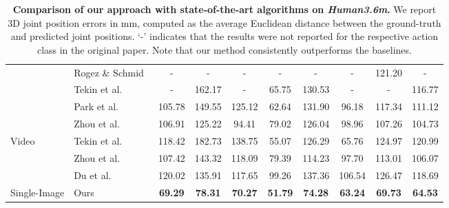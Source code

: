 \begin{table*}[tbph]
\begin{center}
{\begin{tabular}[b]{llcccccccc}
				&Rogez \& Schmid~\cite{Rogez16}	    & -           	& -              & -               & -           		   & -               & -                     & 121.20    	   & -   					\\
				&Tekin et al.~\cite{Tekin16b}       & -      		& 162.17         & -               & 65.75       		   & 130.53          & -                 	 & -			   & 116.77             				\\
				&Park et al.~\cite{Park16}          & 105.78    	& 149.55         & 125.12          & 62.64       		   & 131.90          & 96.18                 & 117.34   	   & 111.12      			\\
				&Zhou et al.~\cite{Zhou16b}         & 106.91    	& 125.22         & 94.41           & 79.02       		   & 126.04          & 98.96                 & 107.26   	   & 104.73      			\\
				\midrule
				\multirow{3}{*}{Video}
				&Tekin et al.~\cite{Tekin16a}		& 118.42    	& 182.73         & 138.75          & 55.07 			 	   & 126.29          & 65.76			  	 & 124.97		   & 120.99     				\\
				&Zhou et al.~\cite{Zhou16a}         & 107.42    	& 143.32         & 118.09          & 79.39       		   & 114.23          & 97.70                 & 113.01   	   & 106.07      			\\
				&Du et al.~\cite{Du16}              & 120.02     	& 135.91         & 117.65          & 99.26       		   & 137.36       	 & 106.54            	 & 126.47    	   & 118.69 			\\
				\midrule
Single-Image &Ours 					& \textbf{69.29}& \textbf{78.31} & \textbf{70.27}  & \textbf{51.79}		   & \textbf{74.28}  & \textbf{63.24}		 & \textbf{69.73}  & \textbf{64.53}		\\
				\bottomrule
			\end{tabular}
		}
	\end{center}
	\vspace{-0.3cm}
	\caption{{\bf   Comparison  of   our   approach  with   state-of-the-art
            algorithms on \emph{Human3.6m}.} We  report 3D joint position errors
          in  mm,  computed  as  the  average  Euclidean  distance  between  the
          ground-truth  and  predicted   joint  positions. `-' indicates  that the
          results  were not  reported for  the  respective action  class in  the
          original  paper.  Note  that our  method consistently  outperforms the
          baselines.  }  \label{tab:overall}
	\vspace{-0.3cm}
\end{table*}

